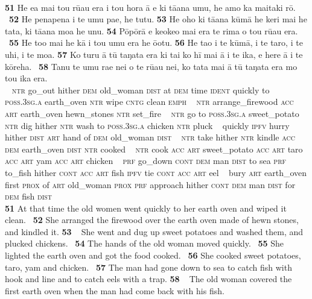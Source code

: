 {~

\bigskip\gll
\textbf{\textup{51}} He e{\ꞌ}a mai tou rū{\ꞌ}au era {\ꞌ}i tou hora {\ꞌ}ā e ki tā{\ꞌ}ana {\ꞌ}umu, he amo ka ma{\ꞌ}itaki rō. ~\textbf{\textup{52}} He penapena i te {\ꞌ}umu pae, he tutu. \textbf{\textup{53}} He oho ki tā{\ꞌ}ana kūmā he keri mai he tata, ki tā{\ꞌ}ana moa he unu. \textbf{\textup{54}} Pōpōrā e ke{\ꞌ}oke{\ꞌ}o mai era te rima o tou rū{\ꞌ}au era. ~\textbf{\textup{55}} He to{\ꞌ}o mai he kā i tou {\ꞌ}umu era he {\ꞌ}ō{\ꞌ}otu. \textbf{\textup{56}} He ta{\ꞌ}o i te kūmā, i te taro, i te {\ꞌ}uhi, i te moa. \textbf{\textup{57}} Ko turu {\ꞌ}ā tū taŋata era ki tai ko hī mai {\ꞌ}ā i te ika, e here {\ꞌ}ā i te kōreha. ~\textbf{\textup{58}} Tanu te {\ꞌ}umu ra{\ꞌ}e nei o te rū{\ꞌ}au nei, ko tata mai {\ꞌ}ā tū taŋata era mo tou ika era.\\
~ \textsc{ntr} go\_out hither \textsc{dem} old\_woman \textsc{dist} at \textsc{dem} time \textsc{ident} quickly to \textsc{poss.3sg.a} earth\_oven \textsc{ntr} wipe \textsc{cntg} clean \textsc{emph} ~ \textsc{ntr} arrange\_firewood \textsc{acc} \textsc{art} earth\_oven hewn\_stones \textsc{ntr} set\_fire ~ \textsc{ntr} go to \textsc{poss.3sg.a} sweet\_potato \textsc{ntr} dig hither \textsc{ntr} wash to \textsc{poss.3sg.a} chicken \textsc{ntr} pluck ~ quickly \textsc{ipfv} hurry hither \textsc{dist} \textsc{art} hand of \textsc{dem} old\_woman \textsc{dist} ~ \textsc{ntr} take hither \textsc{ntr} kindle \textsc{acc} \textsc{dem} earth\_oven \textsc{dist} \textsc{ntr} cooked  ~ \textsc{ntr} cook \textsc{acc} \textsc{art} sweet\_potato \textsc{acc} \textsc{art} taro \textsc{acc} \textsc{art} yam \textsc{acc} \textsc{art} chicken ~ \textsc{prf} go\_down \textsc{cont} \textsc{dem} man \textsc{dist} to sea \textsc{prf} to\_fish hither \textsc{cont} \textsc{acc} \textsc{art} fish \textsc{ipfv} tie \textsc{cont} \textsc{acc} \textsc{art} eel ~ bury \textsc{art} earth\_oven first \textsc{prox} of \textsc{art} old\_woman \textsc{prox} \textsc{prf} approach hither \textsc{cont} \textsc{dem} man \textsc{dist} for \textsc{dem} fish \textsc{dist}\\

\medskip\glt
\textbf{\textup{51}} At that time the old women went quickly to her earth oven and wiped it clean. ~\textbf{\textup{52}} She arranged the firewood over the earth oven made of hewn stones, and kindled it. \textbf{\textup{53~~}}She went and dug up sweet potatoes and washed them, and plucked chickens. ~\textbf{\textup{54}} The hands of the old woman moved quickly. ~\textbf{\textup{55}} She lighted the earth oven and got the food cooked. ~\textbf{\textup{56}} She cooked sweet potatoes, taro, yam and chicken. ~\textbf{\textup{57}} The man had gone down to sea to catch fish with hook and line and to catch eels with a trap. \textbf{\textup{58~~}}The old woman covered the first earth oven when the man had come back with his fish.


}
